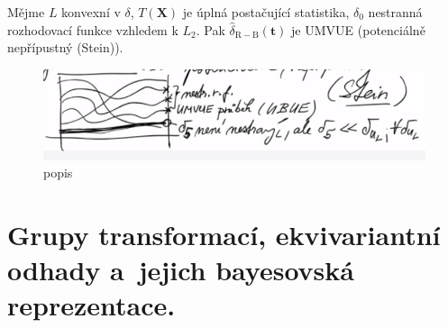 \begin{theorem}
	Mějme $L$ konvexní v $\delta$, $T(\textbf{X})$ je úplná postačující statistika, $\delta_0$ nestranná rozhodovací funkce vzhledem k $L_2$. Pak $\widehat{\delta}_\mathrm{R-B}(\textbf{t})$ je UMVUE (potenciálně nepřípustný (Stein)).
	
	\begin{figure}[h]
		\centering
		\includegraphics[width=0.6\linewidth]{pictures/3.12-1}
		\caption{popis}
		\label{fig:3}
	\end{figure}
	
\end{theorem}

\chapter{Grupy transformací, ekvivariantní odhady a~jejich bayesovská reprezentace.}

